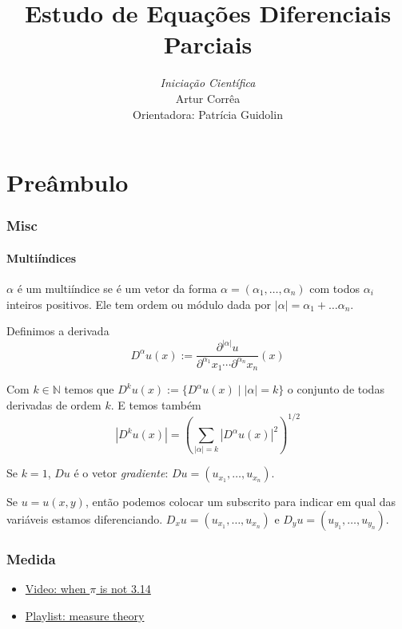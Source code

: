 \documentclass[11pt]{article}
\title{Estudo de Equações Diferenciais Parciais}
\author{\textit{Iniciação Científica}\\   Artur Corrêa \\ Orientadora: Patrícia Guidolin}
\newcommand{\N}{\mathbb{N}}
\newcommand{\p}{\partial}
\begin{document}
\maketitle

\tableofcontents







\pagebreak
\part{Preâmbulo}

\section{Misc}

\subsection{Multiíndices}

\( \alpha \) é um multiíndice se é um vetor da forma \( \alpha = (\alpha_1, \ldots, \alpha_n) \) com todos \( \alpha_i \) inteiros positivos. Ele tem ordem ou módulo dada por \( |\alpha| = \alpha_1 + \ldots \alpha_n \).

Definimos a derivada \[ D^\alpha u(x) := \frac{\p^{|\alpha|}u}{\p^{\alpha_1}x_1 \cdots \p^{\alpha_n}x_n}(x) \]

Com \( k \in \N \) temos que \( D^ku(x):=\{ D^{\alpha}u(x) \mid  |\alpha| =k\} \) o conjunto de todas derivadas de ordem \( k \). E temos também \[ | D^k u(x) | = \left( \sum_{|\alpha|=k}|D^{\alpha}u(x)|^2\right)^{1/2} \]

Se \( k=1 \), \( Du \) é o vetor \textit{gradiente}: \( Du=(u_{x_1}, \ldots, u_{x_n}) \).

Se \( u=u(x,y) \), então podemos colocar um subscrito para indicar em qual das variáveis estamos diferenciando. \( D_xu = (u_{x_1}, \ldots, u_{x_n}) \) e \( D_yu=(u_{y_1}, \ldots, u_{y_n}) \).

\section{Medida}

\begin{itemize}
	\item \href{https://www.youtube.com/watch?v=ineO1tIyPfM}{Video: when \( \pi \) is not 3.14}
	\item \href{https://www.youtube.com/playlist?list=PLBh2i93oe2qvMVqAzsX1Kuv6-4fjazZ8j}{Playlist: measure theory}
\end{itemize}
\end{document}
